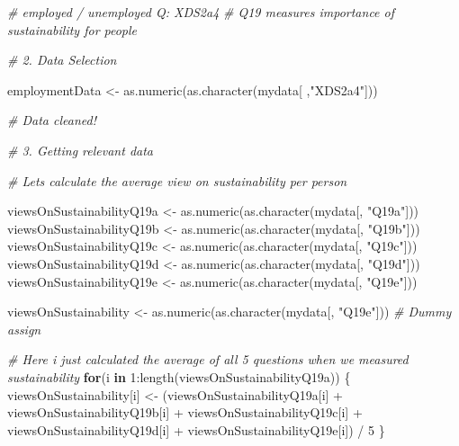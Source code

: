 \documentclass[
]{article}
\newenvironment{Shaded}{\begin{snugshade}}{\end{snugshade}}
\newcommand{\CommentTok}[1]{\textcolor[rgb]{0.56,0.35,0.01}{\textit{#1}}}
\newcommand{\ControlFlowTok}[1]{\textcolor[rgb]{0.13,0.29,0.53}{\textbf{#1}}}
\newcommand{\DecValTok}[1]{\textcolor[rgb]{0.00,0.00,0.81}{#1}}
\newcommand{\FunctionTok}[1]{\textcolor[rgb]{0.00,0.00,0.00}{#1}}
\newcommand{\NormalTok}[1]{#1}
\newcommand{\OtherTok}[1]{\textcolor[rgb]{0.56,0.35,0.01}{#1}}
\newcommand{\SpecialCharTok}[1]{\textcolor[rgb]{0.00,0.00,0.00}{#1}}
\newcommand{\StringTok}[1]{\textcolor[rgb]{0.31,0.60,0.02}{#1}}
\begin{document}
\begin{Shaded}
\begin{Highlighting}[]
\CommentTok{\# employed / unemployed Q: XDS2a4}
\CommentTok{\# Q19 measures importance of sustainability for people}

\CommentTok{\# 2. Data Selection}

\NormalTok{employmentData }\OtherTok{\textless{}{-}} \FunctionTok{as.numeric}\NormalTok{(}\FunctionTok{as.character}\NormalTok{(mydata[ ,}\StringTok{"XDS2a4"}\NormalTok{]))}

\CommentTok{\# Data cleaned!}

\CommentTok{\# 3. Getting relevant data}

\CommentTok{\# Let\textquotesingle{}s calculate the average view on sustainability per person}

\NormalTok{viewsOnSustainabilityQ19a }\OtherTok{\textless{}{-}} \FunctionTok{as.numeric}\NormalTok{(}\FunctionTok{as.character}\NormalTok{(mydata[, }\StringTok{"Q19a"}\NormalTok{])) }
\NormalTok{viewsOnSustainabilityQ19b }\OtherTok{\textless{}{-}} \FunctionTok{as.numeric}\NormalTok{(}\FunctionTok{as.character}\NormalTok{(mydata[, }\StringTok{"Q19b"}\NormalTok{]))}
\NormalTok{viewsOnSustainabilityQ19c }\OtherTok{\textless{}{-}} \FunctionTok{as.numeric}\NormalTok{(}\FunctionTok{as.character}\NormalTok{(mydata[, }\StringTok{"Q19c"}\NormalTok{]))}
\NormalTok{viewsOnSustainabilityQ19d }\OtherTok{\textless{}{-}} \FunctionTok{as.numeric}\NormalTok{(}\FunctionTok{as.character}\NormalTok{(mydata[, }\StringTok{"Q19d"}\NormalTok{]))}
\NormalTok{viewsOnSustainabilityQ19e }\OtherTok{\textless{}{-}} \FunctionTok{as.numeric}\NormalTok{(}\FunctionTok{as.character}\NormalTok{(mydata[, }\StringTok{"Q19e"}\NormalTok{]))}

\NormalTok{viewsOnSustainability }\OtherTok{\textless{}{-}} \FunctionTok{as.numeric}\NormalTok{(}\FunctionTok{as.character}\NormalTok{(mydata[, }\StringTok{"Q19e"}\NormalTok{])) }\CommentTok{\# Dummy assign}

\CommentTok{\# Here i just calculated the average of all 5 questions when we measured sustainability }
\ControlFlowTok{for}\NormalTok{(i }\ControlFlowTok{in} \DecValTok{1}\SpecialCharTok{:}\FunctionTok{length}\NormalTok{(viewsOnSustainabilityQ19a)) \{}
\NormalTok{  viewsOnSustainability[i] }\OtherTok{\textless{}{-}}\NormalTok{ (viewsOnSustainabilityQ19a[i] }\SpecialCharTok{+}\NormalTok{ viewsOnSustainabilityQ19b[i] }\SpecialCharTok{+}\NormalTok{ viewsOnSustainabilityQ19c[i] }\SpecialCharTok{+}\NormalTok{ viewsOnSustainabilityQ19d[i] }\SpecialCharTok{+}\NormalTok{ viewsOnSustainabilityQ19e[i]) }\SpecialCharTok{/} \DecValTok{5}
\NormalTok{\}}


\end{Highlighting}
\end{Shaded}
\end{document}
